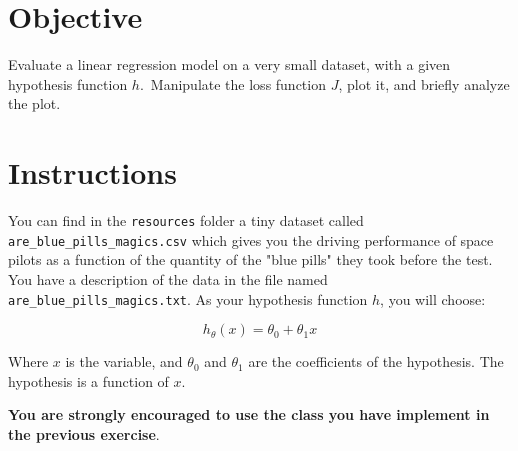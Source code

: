 \documentclass{42-en}
\begin{document}
\section*{Objective}
Evaluate a linear regression model on a very small dataset, with a given hypothesis function $h$.\
Manipulate the loss function $J$, plot it, and briefly analyze the plot.

\section*{Instructions}
You can find in the \texttt{resources} folder a tiny dataset called \texttt{are\_blue\_pills\_magics.csv} which gives you the driving performance of space pilots as a function of the quantity of the "blue pills" they took before the test.
You have a description of the data in the file named \texttt{are\_blue\_pills\_magics.txt}.
As your hypothesis function $h$, you will choose:

$$
h_{\theta}(x) = \theta_0 + \theta_1x
$$

Where $x$ is the variable, and $\theta_0$ and $\theta_1$ are the coefficients of the hypothesis.
The hypothesis is a function of $x$.

\textbf{You are strongly encouraged to use the class you have implement in the previous exercise}.
\newline
\end{document}
